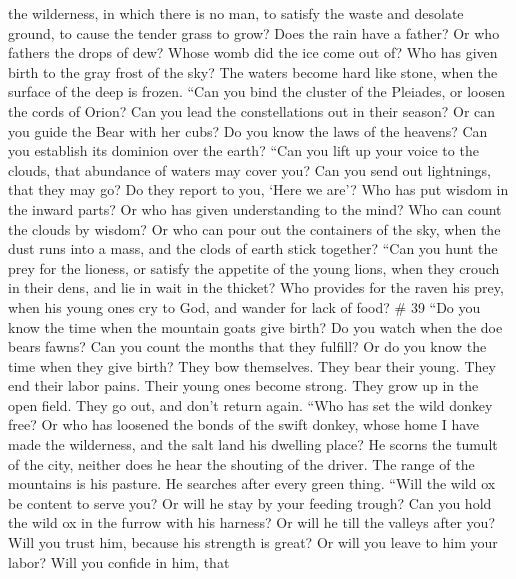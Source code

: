 the wilderness, in which there is no man,  to satisfy the
waste and desolate ground, to cause the tender grass to grow?
 Does the rain have a father? Or who fathers the drops of
dew?  Whose womb did the ice come out of? Who has given
birth to the gray frost of the sky?  The waters become hard
like stone, when the surface of the deep is frozen.  ``Can
you bind the cluster of the Pleiades, or loosen the cords of Orion?
 Can you lead the constellations out in their season? Or
can you guide the Bear with her cubs?  Do you know the laws
of the heavens? Can you establish its dominion over the earth?
 ``Can you lift up your voice to the clouds, that abundance
of waters may cover you?  Can you send out lightnings, that
they may go? Do they report to you, `Here we are'?  Who has
put wisdom in the inward parts? Or who has given understanding to the
mind?  Who can count the clouds by wisdom? Or who can pour
out the containers of the sky,  when the dust runs into a
mass, and the clods of earth stick together?  ``Can you
hunt the prey for the lioness, or satisfy the appetite of the young
lions,  when they crouch in their dens, and lie in wait in
the thicket?  Who provides for the raven his prey, when his
young ones cry to God, and wander for lack of food? \# 39 
``Do you know the time when the mountain goats give birth? Do you watch
when the doe bears fawns?  Can you count the months that
they fulfill? Or do you know the time when they give birth? 
They bow themselves. They bear their young. They end their labor pains.
 Their young ones become strong. They grow up in the open
field. They go out, and don't return again.  ``Who has set
the wild donkey free? Or who has loosened the bonds of the swift donkey,
 whose home I have made the wilderness, and the salt land
his dwelling place?  He scorns the tumult of the city,
neither does he hear the shouting of the driver.  The range
of the mountains is his pasture. He searches after every green thing.
 ``Will the wild ox be content to serve you? Or will he stay
by your feeding trough?  Can you hold the wild ox in the
furrow with his harness? Or will he till the valleys after you?
 Will you trust him, because his strength is great? Or will
you leave to him your labor?  Will you confide in him, that
